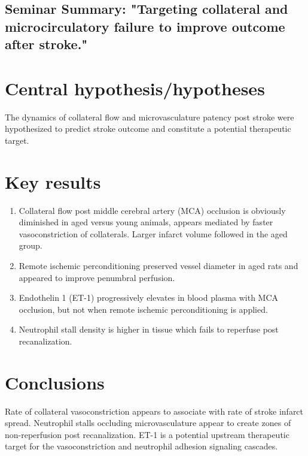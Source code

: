 \documentclass[12pt, letterpaper]{article}
\begin{document}
\begin{center}
    {\section*{\normalfont\normalsize\bf Seminar Summary: "Targeting collateral and microcirculatory failure to improve outcome after stroke."}}
\end{center}

\section*{\normalfont\normalsize\bf Central hypothesis/hypotheses}
\noindent The dynamics of collateral flow and microvasculature patency post stroke were hypothesized to predict stroke outcome and constitute a potential therapeutic target.

\section*{\normalfont\normalsize\bf Key results}
\begin{enumerate}
    \item Collateral flow post middle cerebral artery (MCA) occlusion is obviously diminished in aged versus young animals, appears mediated by faster vasoconstriction of collaterals. Larger infarct volume followed in the aged group.
    \item Remote ischemic perconditioning preserved vessel diameter in aged rats and appeared to improve penumbral perfusion.
    \item Endothelin 1 (ET-1) progressively elevates in blood plasma with MCA occlusion, but not when remote ischemic perconditioning is applied. 
    \item Neutrophil stall density is higher in tissue which fails to reperfuse post recanalization. 
\end{enumerate}

\section*{\normalfont\normalsize\bf Conclusions}
\noindent Rate of collateral vasoconstriction appears to associate with rate of stroke infarct spread. Neutrophil stalls occluding microvasculature appear to create zones of non-reperfusion post recanalization. ET-1 is a potential upstream therapeutic target for the vasoconstriction and neutrophil adhesion signaling cascades.
\end{document}
